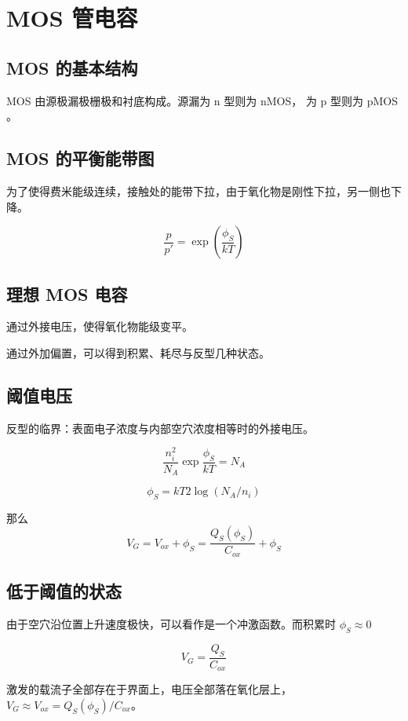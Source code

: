 \documentclass[cn,11pt,chinese,black,simple]{../elegantbook}
\begin{document}
\fi 
\def\chapname{04mos}

\chapter{MOS 管电容}


\section{MOS 的基本结构}

MOS 由源极漏极栅极和衬底构成。源漏为 n 型则为 nMOS， 为 p 型则为 pMOS 。

\section{MOS 的平衡能带图}

为了使得费米能级连续，接触处的能带下拉，由于氧化物是刚性下拉，另一侧也下降。

\[\frac{p}{p'} = \exp(\frac{\phi_S}{kT})\] 


\section{理想 MOS 电容}

通过外接电压，使得氧化物能级变平。

通过外加偏置，可以得到积累、耗尽与反型几种状态。

\section{阈值电压}

反型的临界：表面电子浓度与内部空穴浓度相等时的外接电压。

\[\frac{n_i^2}{N_A}\exp \frac{\phi_S}{k T} = N_A\] 

\[\phi_S = k T 2 \log (N_A/n_i)\]

那么 \[V_G = V_{ox} + \phi_S = \frac{Q_S(\phi_S)}{C_{ox}} + \phi_S\]

\section{低于阈值的状态}

由于空穴沿位置上升速度极快，可以看作是一个冲激函数。而积累时 \(\phi_S \approx 0\) 

\[V_G = \frac{Q_S}{C_{ox}}\]

激发的载流子全部存在于界面上，电压全部落在氧化层上，\(V_G \approx V_{ox} = Q_S(\phi_S)/C_{ox}\)。
\end{document}
